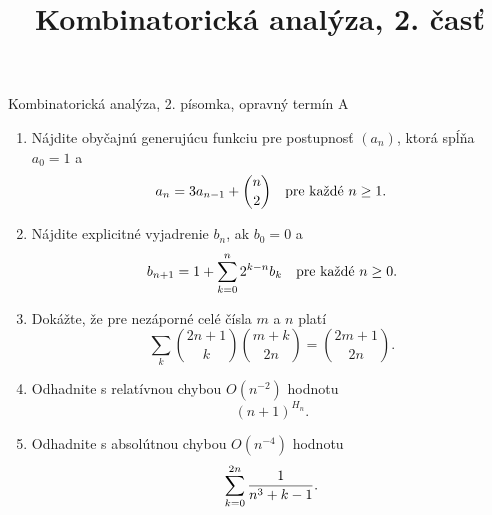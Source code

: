 \documentclass[a4paper, 12pt]{article}
\title{Kombinatorická analýza, 2. časť}
\date{}
\begin{document}
\centerline{Kombinatorická analýza, 2. písomka, opravný termín A}

\begin{enumerate}
\item
Nájdite obyčajnú generujúcu funkciu pre postupnosť $(a_n)$, ktorá spĺňa $a_0=1$ a
$$
a_n = 3a_{n-1} + {n\choose 2}\quad\hbox{pre každé $n\ge 1$}.
$$

\item
Nájdite explicitné vyjadrenie $b_n$, ak $b_0=0$ a
$$
b_{n+1} = 1 + \sum_{k=0}^n 2^{k-n}b_k\quad\hbox{pre každé $n\ge 0$}.
$$

\item
Dokážte, že pre nezáporné celé čísla $m$ a $n$ platí
$$
\sum_k {2n+1\choose k}{m+k\choose 2n}={2m+1\choose 2n}.
$$

\item
Odhadnite s relatívnou chybou $O(n^{-2})$ hodnotu
$$
(n+1)^{H_n}.
$$

\item
Odhadnite s absolútnou chybou $O(n^{-4})$ hodnotu
$$
\sum_{k=0}^{2n} {1\over n^3+k-1}.
$$


\end{enumerate}
\end{document}
